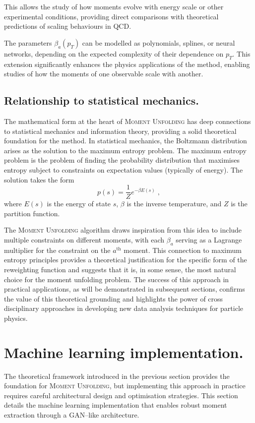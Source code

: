         This allows the study of how moments evolve with energy scale or other experimental conditions, providing direct comparisons with theoretical predictions of scaling behaviours in QCD.

        The parameters $\beta_a(p_T)$ can be modelled as polynomials, splines, or neural networks, depending on the expected complexity of their dependence on $p_T$.
        This extension significantly enhances the physics applications of the method, enabling studies of how the moments of one observable scale with another.

    \subsection{Relationship to statistical mechanics.}
        The mathematical form at the heart of \textsc{Moment Unfolding} has deep connections to statistical mechanics and information theory, providing a solid theoretical foundation for the method.
        In statistical mechanics, the Boltzmann distribution arises as the solution to the maximum entropy problem.
        The maximum entropy problem is the problem of finding the probability distribution that maximises entropy subject to constraints on expectation values (typically of energy).
        The solution takes the form
        \[
            p(s) = \frac{1}{Z} e^{-\beta E(s)}\;,
        \]
        where $E(s)$ is the energy of state $s$, $\beta$ is the inverse temperature, and $Z$ is the partition function.

        The \textsc{Moment Unfolding} algorithm draws inspiration from this idea to include multiple constraints on different moments, with each $\beta_a$ serving as a Lagrange multiplier for the constraint on the $a^{\text{th}}$ moment.
        This connection to maximum entropy principles provides a theoretical justification for the specific form of the reweighting function and suggests that it is, in some sense, the most natural choice for the moment unfolding problem.
        The success of this approach in practical applications, as will be demonstrated in subsequent sections, confirms the value of this theoretical grounding and highlights the power of cross disciplinary approaches in developing new data analysis techniques for particle physics.
        
\section{Machine learning implementation.}
    The theoretical framework introduced in the previous section provides the foundation for \textsc{Moment Unfolding}, but implementing this approach in practice requires careful architectural design and optimisation strategies.
    This section details the machine learning implementation that enables robust moment extraction through a GAN--like architecture.

